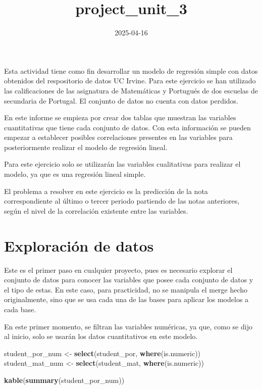 \documentclass[
]{article}
\title{project\_unit\_3}
\author{}
\date{\vspace{-2.5em}2025-04-16}
\newenvironment{Shaded}{\begin{snugshade}}{\end{snugshade}}
\newcommand{\FunctionTok}[1]{\textcolor[rgb]{0.13,0.29,0.53}{\textbf{#1}}}
\newcommand{\NormalTok}[1]{#1}
\newcommand{\OtherTok}[1]{\textcolor[rgb]{0.56,0.35,0.01}{#1}}
\begin{document}
\maketitle

Esta actividad tiene como fin desarrollar un modelo de regresión simple
con datos obtenidos del respositorio de datos UC Irvine. Para este
ejercicio se han utilizado las calificaciones de las asignatura de
Matemáticas y Portugués de dos escuelas de secundaria de Portugal. El
conjunto de datos no cuenta con datos perdidos.

En este informe se empieza por crear dos tablas que muestran las
variables cuantitativas que tiene cada conjunto de datos. Con esta
información se pueden empezar a establecer posibles correlaciones
presentes en las variables para posteriormente realizar el modelo de
regresión lineal.

Para este ejercicio solo se utilizarán las variables cualitativas para
realizar el modelo, ya que es una regresión lineal simple.

El problema a resolver en este ejercicio es la predicción de la nota
correspondiente al último o tercer periodo partiendo de las notas
anteriores, según el nivel de la correlación existente entre las
variables.

\section{Exploración de datos}\label{exploraciuxf3n-de-datos}

Este es el primer paso en cualquier proyecto, pues es necesario explorar
el conjunto de datos para conocer las variables que posee cada conjunto
de datos y el tipo de estas. En este caso, para practicidad, no se
manipula el merge hecho originalmente, sino que se usa cada una de las
bases para aplicar los modelos a cada base.

En este primer momento, se filtran las variables numéricas, ya que, como
se dijo al inicio, solo se usarán los datos cuantitativos en este
modelo.

\begin{Shaded}
\begin{Highlighting}[]
\NormalTok{student\_por\_num }\OtherTok{\textless{}{-}} \FunctionTok{select}\NormalTok{(student\_por, }\FunctionTok{where}\NormalTok{(is.numeric))}
\NormalTok{student\_mat\_num }\OtherTok{\textless{}{-}} \FunctionTok{select}\NormalTok{(student\_mat, }\FunctionTok{where}\NormalTok{(is.numeric))}

\FunctionTok{kable}\NormalTok{(}\FunctionTok{summary}\NormalTok{(student\_por\_num))}
\end{Highlighting}
\end{Shaded}
\end{document}
